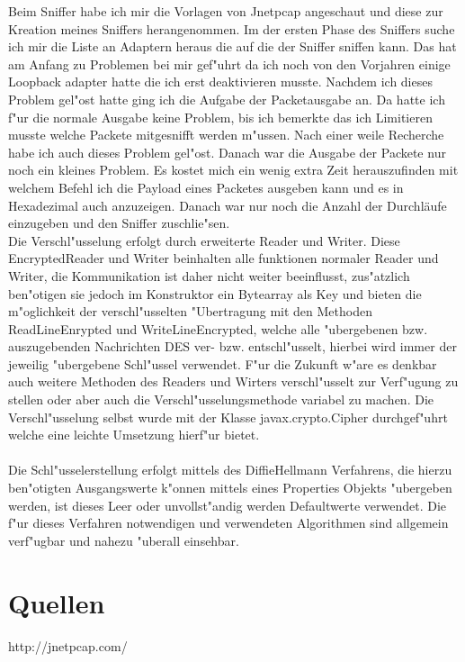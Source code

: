 \documentclass[a4paper,12pt]{scrreprt}
\begin{document}
Beim Sniffer habe ich mir die Vorlagen von Jnetpcap angeschaut und diese zur Kreation meines Sniffers herangenommen.
Im der ersten Phase des Sniffers suche ich mir die Liste an Adaptern heraus die auf die der Sniffer sniffen kann.
Das hat am Anfang zu Problemen bei mir gef"uhrt da ich noch von den Vorjahren einige Loopback adapter hatte die ich erst deaktivieren musste. Nachdem ich dieses Problem gel"ost hatte ging ich die Aufgabe der Packetausgabe an. Da hatte ich f"ur die normale Ausgabe keine Problem, bis ich bemerkte das ich Limitieren musste welche Packete mitgesnifft werden m"ussen. Nach einer weile Recherche habe ich auch dieses Problem gel"ost. Danach war die Ausgabe der Packete nur noch ein kleines Problem. Es kostet mich ein wenig extra Zeit herauszufinden mit welchem Befehl ich die Payload eines Packetes ausgeben kann und es in Hexadezimal auch anzuzeigen. Danach war nur noch die Anzahl der Durchläufe einzugeben und den Sniffer zuschlie"sen. 
\\Die Verschl"usselung erfolgt durch erweiterte Reader und Writer. Diese EncryptedReader und Writer beinhalten alle funktionen normaler Reader und Writer, die Kommunikation ist daher nicht weiter beeinflusst, zus"atzlich ben"otigen sie jedoch im Konstruktor ein Bytearray als Key und bieten die m"oglichkeit der verschl"usselten "Ubertragung mit den Methoden ReadLineEnrypted und WriteLineEncrypted, welche alle "ubergebenen bzw. auszugebenden Nachrichten DES ver- bzw. entschl"usselt, hierbei wird immer der jeweilig "ubergebene Schl"ussel verwendet. F"ur die Zukunft w"are es denkbar auch weitere Methoden des Readers und Wirters verschl"usselt zur Verf"ugung zu stellen oder aber auch die Verschl"usselungsmethode variabel zu machen. Die Verschl"usselung selbst wurde mit der Klasse javax.crypto.Cipher durchgef"uhrt welche eine leichte Umsetzung hierf"ur bietet.\\
\\Die Schl"usselerstellung erfolgt mittels des DiffieHellmann Verfahrens, die hierzu ben"otigten Ausgangswerte k"onnen mittels eines Properties Objekts "ubergeben werden, ist dieses Leer oder unvollst"andig werden Defaultwerte verwendet. Die f"ur dieses Verfahren notwendigen und verwendeten Algorithmen sind allgemein verf"ugbar und nahezu "uberall einsehbar.
\chapter{Quellen}
http://jnetpcap.com/
\end{document}
